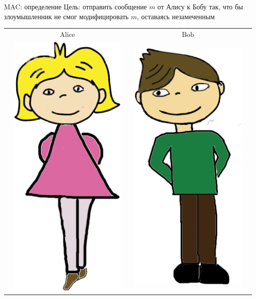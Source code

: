 \documentclass[usenames,dvipsnames,8pt,aspectratio=169]{beamer}
\begin{document}
\begin{frame}{MAC: определение}
\Large
Цель: отправить сообщение $m$ от Алису к Бобу так, что бы злоумышленник не смог модифицировать $m$, оставаясь незамеченным \\[10pt]
\begin{center}
	\begin{tabular}{c c c c c}
		& Alice  & & Bob &  \\
		& \multirow{5}{*}{\includegraphics[scale=0.18]{Alice}} & &
		\multirow{5}{*}{\includegraphics[scale=0.18]{Bob}} &  \\

\end{tabular}
\end{center}
\end{frame}
\end{document}
